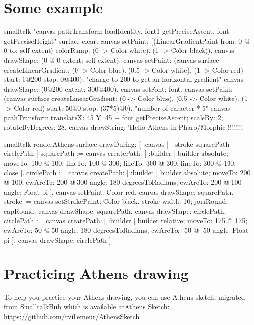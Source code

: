 \documentclass[10pt,twoside,english]{_support/latex/sbabook/sbabook}
\begin{document}
\section{Some example}\begin{displaycode}{smalltalk}
"canvas pathTransform loadIdentity.  font1 getPreciseAscent. font getPreciseHeight"
   surface clear.
   canvas
    setPaint:
     ((LinearGradientPaint from: 0 @ 0 to: self extent)
      colorRamp:
       {(0 -> Color white).
       (1 -> Color black)}).
   canvas drawShape: (0 @ 0 extent: self extent).
   canvas
    setPaint:
     (canvas surface
      createLinearGradient:
       {(0 -> Color blue).
       (0.5 -> Color white).
       (1 -> Color red)}
      start: 0@200
      stop: 0@400). "change to 200 to get an horizontal gradient"
   canvas drawShape: (0@200 extent: 300@400).
   canvas setFont: font.
   canvas
    setPaint:
     (canvas surface
      createLinearGradient:
       {(0 -> Color blue).
       (0.5 -> Color white).
       (1 -> Color red)}
      start: 50@0
      stop: (37*5)@0). "number of caracter * 5"
   canvas pathTransform
    translateX: 45 Y: 45 + font getPreciseAscent;
    scaleBy: 2;
    rotateByDegrees: 28.
   canvas
    drawString: 'Hello Athens in Pharo/Morphic !!!!!!!'.
\end{displaycode}
\begin{displaycode}{smalltalk}
renderAthens
 surface
  drawDuring: [ :canvas | 
   | stroke squarePath circlePath |
   squarePath := canvas
    createPath: [ :builder | 
     builder
      absolute;
      moveTo: 100 @ 100;
      lineTo: 100 @ 300;
      lineTo: 300 @ 300;
      lineTo: 300 @ 100;
      close ].
   circlePath := canvas
    createPath: [ :builder | 
     builder
      absolute;
      moveTo: 200 @ 100;
      cwArcTo: 200 @ 300 angle: 180 degreesToRadians;
      cwArcTo: 200 @ 100 angle: Float pi ].
   canvas setPaint: Color red.
   canvas drawShape: squarePath.
   stroke := canvas setStrokePaint: Color black.
   stroke
    width: 10;
    joinRound;
    capRound.
   canvas drawShape: squarePath.
   canvas drawShape: circlePath.
   circlePath := canvas
    createPath: [ :builder | 
     builder
      relative;
      moveTo: 175 @ 175;
      cwArcTo: 50 @ 50 angle: 180 degreesToRadians;
      cwArcTo: -50 @ -50 angle: Float pi ].
   canvas drawShape: circlePath ]
\end{displaycode}

\section{Practicing Athens drawing}
To help you practice your Athens drawing, you can use Athens sketch, migrated from SmalltalkHub which is available at\href{https://github.com/rvillemeur/AthensSketch}{Athens Sketch: \href{https://github.com/rvillemeur/AthensSketch}{https://github.com/rvillemeur/AthensSketch}}
\end{document}
